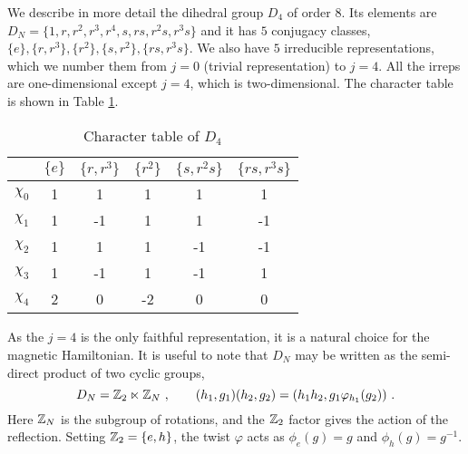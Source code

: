 

\bigskip

We describe in more detail the dihedral group $D_4$ of order $8$.
Its elements are $D_N = \{1, r, r^2, r^3, r^4, s, r s, r^2 s, r^3 s \}$ and it has $5$ conjugacy classes, $\{e\},\{r,r^3\},\{r^2\},\{s,r^2\},\{rs,r^3s\}$.
We also have $5$ irreducible representations, which we number them from $j=0$ (trivial representation) to $j=4$.
All the irreps are one-dimensional except $j=4$, which is two-dimensional.
The character table is shown in Table \ref{tab:char}.
\begin{table}[h]
    \centering
    \begin{tabular}{c|c|c|c|c|c}
     & $\{e\}$&$\{r,r^3\}$&$\{r^2\}$&$\{s,r^2s\}$&$\{rs,r^3s\}$ \\
     \hline
        $\chi_0 $ & 1 & 1  & 1  & 1  & 1  \\
        $\chi_1 $ & 1 & -1 & 1  & 1  & -1 \\
        $\chi_2 $ & 1 & 1  & 1  & -1 & -1 \\
        $\chi_3 $ & 1 & -1 & 1  & -1 & 1  \\
        $\chi_4 $ & 2 & 0  & -2 & 0  & 0
    \end{tabular}
    \caption{Character table of $D_4$}
    \label{tab:char}
    \vspace{-3mm}
\end{table}
As the $j=4$ is the only faithful representation, it is a natural choice for the magnetic Hamiltonian.
It is useful to note that $D_N$ may be written as the semi-direct product of two cyclic groups,
\begin{equation}
    \label{eq:semidirect product}
    D_N = \mathbb{Z}_2 \ltimes \mathbb{Z}_N \ , \quad \quad (h_1,g_1) (h_2,g_2) = (h_1h_2, g_1\varphi_{h_1}(g_2)) \ .
\end{equation}
Here $\mathbb{Z}_N$ is the subgroup of rotations, and the $\mathbb{Z}_2$ factor gives the action of the reflection.
Setting $\mathbb{Z}_2 = \{e, h\}$, the twist $\varphi$ acts as $\phi_e(g)=g$ and $\phi_h(g)=g^{-1}$.
